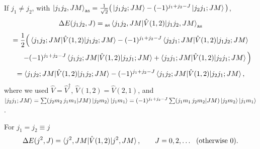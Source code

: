 \documentclass[11pt,a4paper]{article}
\newcommand{\op}[1]{\hat{#1}}
\begin{document}
If $j_1\ne j_2$, with $\ket{j_1j_2,JM}_{\rm as}=\frac{1}{\sqrt2}\big(\ket{j_1j_2;JM}-(-1)^{j_1+j_2-J}\ket{j_2j_1;JM}\big)$,
\[
\Delta E(j_1j_2,J)={}_{\rm as}\braket{j_1j_2,JM|\op V(1,2)|j_1j_2,JM}_{\rm as}
\]
\[
=\frac12\Big(\braket{j_1j_2;JM|\op V(1,2)|j_1j_2;JM}-(-1)^{j_1+j_2-J}\braket{j_2j_1;JM|\op V(1,2)|j_1j_2;JM}
\]
\[
\qquad-(-1)^{j_1+j_2-J}\braket{j_1j_2;JM|\op V(1,2)|j_2j_1;JM}+\braket{j_2j_1;JM|\op V(1,2)|j_2j_1;JM}\Big)
\]
\[
=\braket{j_1j_2;JM|\op V(1,2)|j_1j_2;JM}-(-1)^{j_1+j_2-J}\braket{j_1j_2;JM|\op V(1,2)|j_2j_1;JM},
\]
where we used $\op V=\op V^\dagger$, $\op V(1,2)=\op V(2,1)$, and
$\ket{j_2j_1;JM}=\sum(j_2m_2\,j_1m_1|JM)\ket{j_2m_2}\ket{j_1m_1}=(-1)^{j_1+j_2-J}\sum(j_1m_1\,j_2m_2|JM)\ket{j_2m_2}\ket{j_1m_1}$.

For $j_1=j_2\equiv j$
\[
\Delta E(j^2,J)=\braket{j^2,JM|\op V(1,2)|j^2,JM},\qquad J=0,2,\dots\ \ (\text{otherwise }0).
\]
\end{document}
